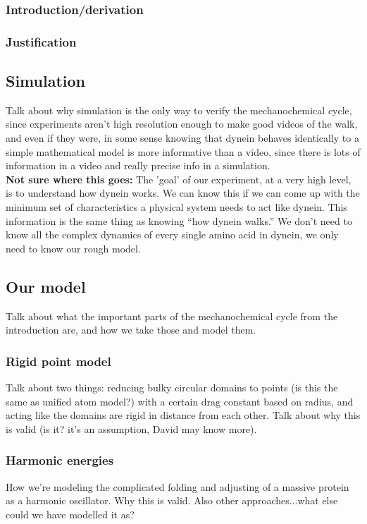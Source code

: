 \documentclass[10pt]{article} %
\begin{document}
                \subsubsection{Introduction/derivation}
                \subsubsection{Justification}

\subsection{Simulation}
Talk about why simulation is the only way to verify the mechanochemical cycle, since experiments
aren't high resolution enough to make good videos of the walk, and even if they were, in some sense
knowing that dynein behaves identically to a simple mathematical model is more informative than
a video, since there is lots of information in a video and really precise info in a simulation.\\

\textbf{Not sure where this goes:} The 'goal' of our experiment, at a very high level, is to
understand how dynein works. We can know this if we can come up with the minimum set of characteristics a physical system needs to act like dynein. This information is the same thing as knowing
``how dynein walks.'' We don't need to know all the complex dynamics of every single amino acid in
dynein, we only need to know our rough model.\\

\subsection{Our model}
Talk about what the important parts of the mechanochemical cycle from the introduction are, and how
we take those and model them.\\
\subsubsection{Rigid point model}
Talk about two things: reducing bulky circular domains to points (is this the same as unified atom
model?) with a certain drag constant based on radius, and acting like the domains are rigid in
distance from each other. Talk about why this is valid (is it? it's an assumption, David may know
more).
\subsubsection{Harmonic energies}
How we're modeling the complicated folding and adjusting of a massive protein as a harmonic
oscillator. Why this is valid. Also other approaches...what else could we have modelled it as?
\end{document}
